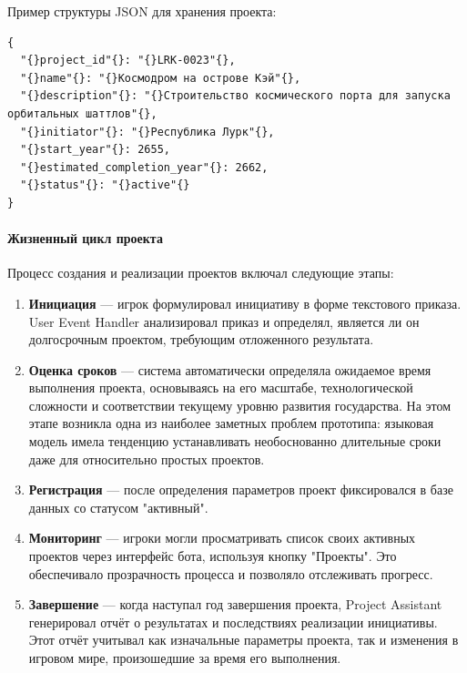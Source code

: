 Пример структуры JSON для хранения проекта:

\begin{verbatim}
{
  "{}project_id"{}: "{}LRK-0023"{},
  "{}name"{}: "{}Космодром на острове Кэй"{},
  "{}description"{}: "{}Строительство космического порта для запуска орбитальных шаттлов"{},
  "{}initiator"{}: "{}Республика Лурк"{},
  "{}start_year"{}: 2655,
  "{}estimated_completion_year"{}: 2662,
  "{}status"{}: "{}active"{}
}
\end{verbatim}

\paragraph{Жизненный цикл проекта}

Процесс создания и реализации проектов включал следующие этапы:

\begin{enumerate}
    \item \textbf{Инициация} — игрок формулировал инициативу в форме текстового приказа. User Event Handler анализировал приказ и определял, является ли он долгосрочным проектом, требующим отложенного результата.

    \item \textbf{Оценка сроков} — система автоматически определяла ожидаемое время выполнения проекта, основываясь на его масштабе, технологической сложности и соответствии текущему уровню развития государства. На этом этапе возникла одна из наиболее заметных проблем прототипа: языковая модель имела тенденцию устанавливать необоснованно длительные сроки даже для относительно простых проектов.

    \item \textbf{Регистрация} — после определения параметров проект фиксировался в базе данных со статусом "{}активный"{}.

    \item \textbf{Мониторинг} — игроки могли просматривать список своих активных проектов через интерфейс бота, используя кнопку "{}Проекты"{}. Это обеспечивало прозрачность процесса и позволяло отслеживать прогресс.

    \item \textbf{Завершение} — когда наступал год завершения проекта, Project Assistant генерировал отчёт о результатах и последствиях реализации инициативы. Этот отчёт учитывал как изначальные параметры проекта, так и изменения в игровом мире, произошедшие за время его выполнения.
\end{enumerate}


